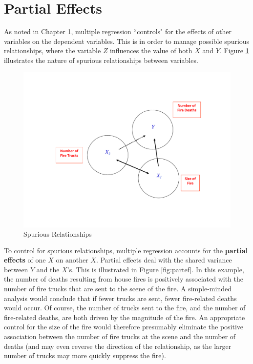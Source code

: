 \documentclass[11pt,openany]{book}\usepackage[]{graphicx}\usepackage[]{color}
\begin{document}
\section{Partial Effects}

As noted in Chapter 1, multiple regression ``controls" for the effects of other variables on the dependent variables. This is in order to manage possible spurious relationships, where the variable $Z$ influences the value of both $X$ and $Y$. Figure \ref{fig:spur} illustrates the nature of
spurious relationships between variables.   
\begin{figure}
  \centering
  \includegraphics[width=5in]{12_LogicMult/spur.pdf}
  \caption{Spurious Relationships \label{fig:spur}}
\end{figure}

To control for spurious relationships, multiple regression accounts for the \textbf{partial effects} of one $X$ on another $X$. Partial effects deal with the shared variance between $Y$ and the $X$'s. This is illustrated in Figure \ref{fig:partef}.  In this example, the number of deaths resulting from house fires is positively associated with the number of fire trucks that are sent to the scene of the fire. A simple-minded analysis would conclude that if fewer trucks are sent, fewer fire-related deaths would occur. Of course, the number of trucks sent to the fire, and the number of 
fire-related deaths, are both driven by the magnitude of the fire. An appropriate control for the size of the fire would therefore presumably eliminate the positive association between the number of fire trucks at the scene and the number of deaths (and may even  reverse the direction of the relationship, as the larger number of trucks may more quickly suppress the fire).
\end{document}
